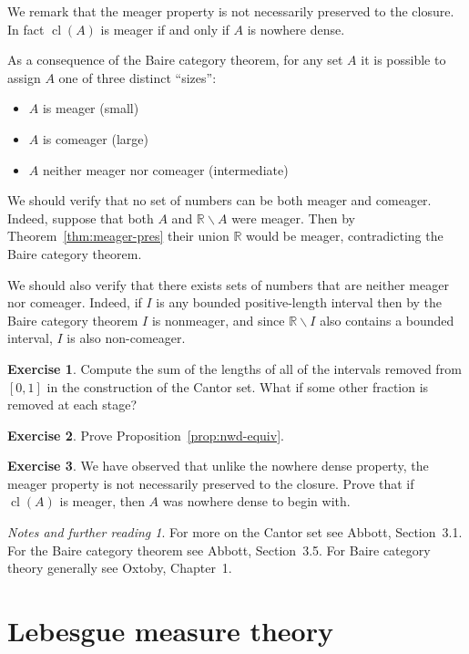\documentclass[11pt,oneside]{amsbook}
\newcommand{\RR}{\mathbb R}
\DeclareMathOperator{\cl}{cl}
\theoremstyle{definition}
\newtheorem{exerc}{Exercise}[section]
\theoremstyle{plain}
\theoremstyle{definition}
\theoremstyle{remark}
\newtheorem*{notes}{Notes and further reading}
\numberwithin{equation}{section}
\numberwithin{figure}{section}
\begin{document}
We remark that the meager property is not necessarily preserved to the closure. In fact $\cl(A)$ is meager if and only if $A$ is nowhere dense.

As a consequence of the Baire category theorem, for any set $A$ it is possible to assign $A$ one of three distinct ``sizes'':
\begin{itemize}
\item $A$ is meager (small)
\item $A$ is comeager (large)
\item $A$ neither meager nor comeager (intermediate)
\end{itemize}
We should verify that no set of numbers can be both meager and comeager. Indeed, suppose that both $A$ and $\RR\smallsetminus A$ were meager. Then by Theorem~\ref{thm:meager-pres} their union $\RR$ would be meager, contradicting the Baire category theorem.

We should also verify that there exists sets of numbers that are neither meager nor comeager. Indeed, if $I$ is any bounded positive-length interval then by the Baire category theorem $I$ is nonmeager, and since $\RR\smallsetminus I$ also contains a bounded interval, $I$ is also non-comeager.

\begin{exerc}
  \label{exerc:cantor}
  Compute the sum of the lengths of all of the intervals removed from $[0,1]$ in the construction of the Cantor set. What if some other fraction is removed at each stage?
\end{exerc}

\begin{exerc}
  \label{exerc:nwd-equiv}
  Prove Proposition~\ref{prop:nwd-equiv}.
\end{exerc}

\begin{exerc}
  We have observed that unlike the nowhere dense property, the meager property is not necessarily preserved to the closure. Prove that if $\cl(A)$ is meager, then $A$ was nowhere dense to begin with.
\end{exerc}

\begin{notes}
  For more on the Cantor set see Abbott, Section~3.1. For the Baire category theorem see Abbott, Section~3.5. For Baire category theory generally see Oxtoby, Chapter~1.
\end{notes}

\section{Lebesgue measure theory}
\end{document}
